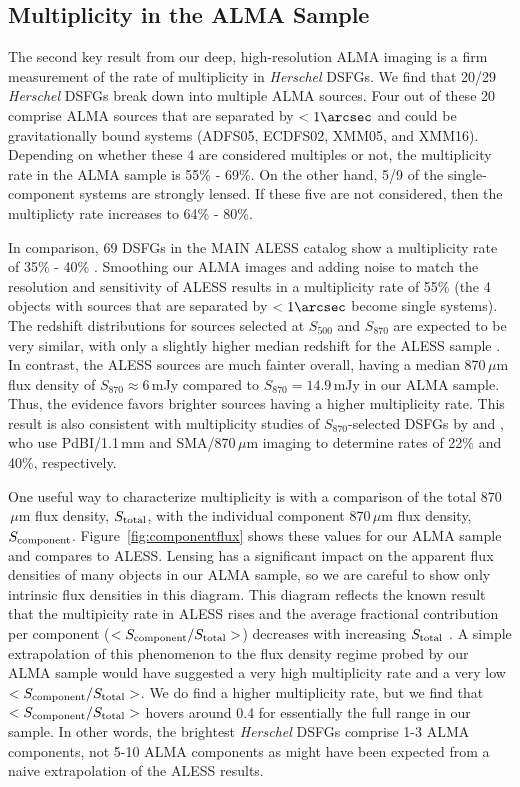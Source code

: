 \documentclass[iop]{emulateapj}
\begin{document}
\subsection{Multiplicity in the ALMA Sample}\label{sec:multiplicity}

The second key result from our deep, high-resolution ALMA imaging is a firm
measurement of the rate of multiplicity in {\it Herschel} DSFGs.  We find that
20/29 {\it Herschel} DSFGs break down into multiple ALMA sources.  Four out of
these 20 comprise ALMA sources that are separated by $<1\arcsec$ and could be
gravitationally bound systems (ADFS05, ECDFS02, XMM05, and XMM16).  Depending
on whether these 4 are considered multiples or not, the multiplicity rate in
the ALMA sample is 55\% - 69\%.  On the other hand, 5/9 of the single-component
systems are strongly lensed.  If these five are not considered, then the
multiplicty rate increases to 64\% - 80\%.  

In comparison, 69 DSFGs in the MAIN ALESS catalog show a multiplicity rate of
35\% - 40\% \citep{Hodge:2013qy}.  Smoothing our ALMA images and adding noise
to match the resolution and sensitivity of ALESS results in a multiplicity rate
of 55\% (the 4 objects with sources that are separated by $<1\arcsec$ become
single systems).  The redshift distributions for sources selected at $S_{500}$
and $S_{870}$ are expected to be very similar, with only a slightly higher
median redshift for the ALESS sample \citep[e.g., $z_{\rm med} = 2.0$ vs.
$z_{\rm med} = 2.2$; see][]{Zavala:2014lr}.  In contrast, the ALESS sources are
much fainter overall, having a median 870$\,\mu$m flux density of $S_{870}
\approx 6\,$mJy compared to $S_{870} =14.9\,$mJy in our ALMA sample.  Thus, the
evidence favors brighter sources having a higher multiplicity rate.  This
result is also consistent with multiplicity studies of $S_{870}$-selected DSFGs
by \citet{Smolcic:2012zl} and \citet{Barger:2012yg}, who use PdBI/1.1$\,$mm and
SMA/870$\,\mu$m imaging to determine rates of 22\% and 40\%, respectively.

One useful way to characterize multiplicity is with a comparison of the total
870$\,\mu$m flux density, $S_{\rm total}$, with the individual component
870$\,\mu$m flux density, $S_{\rm component}$.  Figure~\ref{fig:componentflux}
shows these values for our ALMA sample and compares to ALESS.  Lensing has a
significant impact on the apparent flux densities of many objects in our ALMA
sample, so we are careful to show only intrinsic flux densities in this
diagram.  This diagram reflects the known result that the multipicity rate in
ALESS rises and the average fractional contribution per component ($<S_{\rm
component}/S_{\rm total}>$) decreases with increasing $S_{\rm total}$
\citep{Hodge:2013qy}.  A simple extrapolation of this phenomenon to the flux
density regime probed by our ALMA sample would have suggested a very high
multiplicity rate and a very low $<S_{\rm component}/S_{\rm total}>$.  We do
find a higher multiplicity rate, but we find that $<S_{\rm component}/S_{\rm
total}>$ hovers around 0.4 for essentially the full range in our sample.  In
other words, the brightest {\it Herschel} DSFGs comprise 1-3 ALMA
components, not 5-10 ALMA components as might have been expected from a naive
extrapolation of the ALESS results.  
\end{document}
